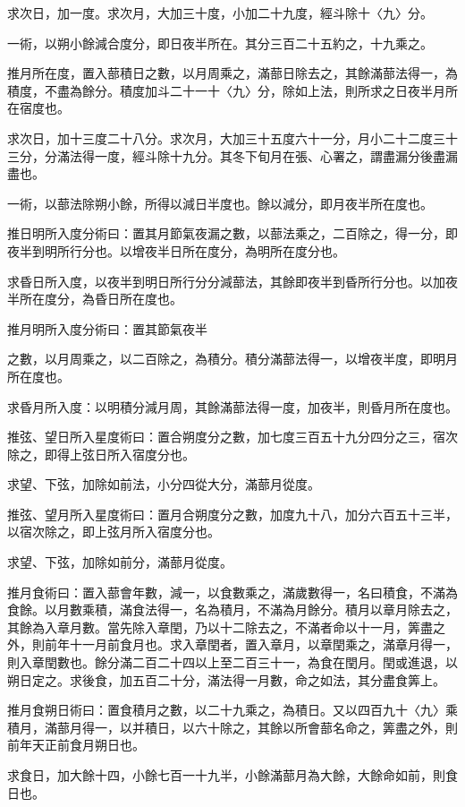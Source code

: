 \begin{pinyinscope}
求次日，加一度。求次月，大加三十度，小加二十九度，經斗除十〈九〉分。

一術，以朔小餘減合度分，即日夜半所在。其分三百二十五約之，十九乘之。

推月所在度，置入蔀積日之數，以月周乘之，滿蔀日除去之，其餘滿蔀法得一，為積度，不盡為餘分。積度加斗二十一十〈九〉分，除如上法，則所求之日夜半月所在宿度也。

求次日，加十三度二十八分。求次月，大加三十五度六十一分，月小二十二度三十三分，分滿法得一度，經斗除十九分。其冬下旬月在張、心署之，謂盡漏分後盡漏盡也。

一術，以蔀法除朔小餘，所得以減日半度也。餘以減分，即月夜半所在度也。

推日明所入度分術曰：置其月節氣夜漏之數，以蔀法乘之，二百除之，得一分，即夜半到明所行分也。以增夜半日所在度分，為明所在度分也。

求昏日所入度，以夜半到明日所行分分減蔀法，其餘即夜半到昏所行分也。以加夜半所在度分，為昏日所在度也。

推月明所入度分術曰：置其節氣夜半

之數，以月周乘之，以二百除之，為積分。積分滿蔀法得一，以增夜半度，即明月所在度也。

求昏月所入度：以明積分減月周，其餘滿蔀法得一度，加夜半，則昏月所在度也。

推弦、望日所入星度術曰：置合朔度分之數，加七度三百五十九分四分之三，宿次除之，即得上弦日所入宿度分也。

求望、下弦，加除如前法，小分四從大分，滿蔀月從度。

推弦、望月所入星度術曰：置月合朔度分之數，加度九十八，加分六百五十三半，以宿次除之，即上弦月所入宿度分也。

求望、下弦，加除如前分，滿蔀月從度。

推月食術曰：置入蔀會年數，減一，以食數乘之，滿歲數得一，名曰積食，不滿為食餘。以月數乘積，滿食法得一，名為積月，不滿為月餘分。積月以章月除去之，其餘為入章月數。當先除入章閏，乃以十二除去之，不滿者命以十一月，筭盡之外，則前年十一月前食月也。求入章閏者，置入章月，以章閏乘之，滿章月得一，則入章閏數也。餘分滿二百二十四以上至二百三十一，為食在閏月。閏或進退，以朔日定之。求後食，加五百二十分，滿法得一月數，命之如法，其分盡食筭上。

推月食朔日術曰：置食積月之數，以二十九乘之，為積日。又以四百九十〈九〉乘積月，滿蔀月得一，以并積日，以六十除之，其餘以所會蔀名命之，筭盡之外，則前年天正前食月朔日也。

求食日，加大餘十四，小餘七百一十九半，小餘滿蔀月為大餘，大餘命如前，則食日也。


\end{pinyinscope}
